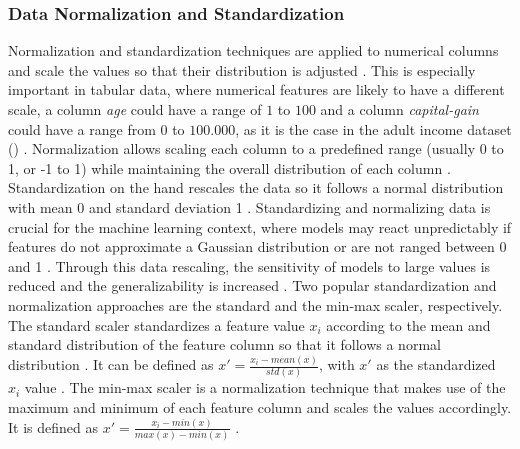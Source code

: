 \subsubsection{Data Normalization and Standardization}
\label{sec:dataNormalization} 
Normalization and standardization techniques are applied to numerical columns and scale the values so that their distribution is adjusted \cite{garcia2016BigDataPreprocessing}.
This is especially important in tabular data, where numerical features are likely to have a different scale, \eg a column \textit{age} could have a range of $1$ to $100$ and a column \textit{capital-gain} could have a range from $0$ to $100.000$, as it is the case in the adult income dataset () \cite{Dua:2019}.
Normalization allows scaling each column to a predefined range (usually 0 to 1, or -1 to 1) while maintaining the overall distribution of each column \cite{izonin2022TwoStepDataNormalization}.
Standardization on the hand rescales the data so it follows a normal distribution with mean 0 and standard deviation 1 \cite{scikit-learndevelopers2023PreprocessingData}.
Standardizing and normalizing data is crucial for the machine learning context, where \glspl{model} may react unpredictably if features do not approximate a Gaussian distribution or are not ranged between 0 and 1 \cite{scikit-learn, scikit-learndevelopers2023PreprocessingData}.
Through this data rescaling, the sensitivity of models to large values is reduced and the generalizability is increased \cite{izonin2022TwoStepDataNormalization}.
Two popular standardization and normalization approaches are the standard and the min-max scaler, respectively.
The standard scaler standardizes a feature value $x_i$ according to the mean and standard distribution of the feature column so that it follows a normal distribution \cite{garcia2016BigDataPreprocessing, izonin2022TwoStepDataNormalization}.
It can be defined as $x' = \frac{x_i-mean(x)}{std(x)}$, with $x'$ as the standardized $x_i$ value \cite{izonin2022TwoStepDataNormalization}.
The min-max scaler is a normalization technique that makes use of the maximum and minimum of each feature column and scales the values accordingly.
It is defined as $x' = \frac{x_i - min(x)}{max(x) - min(x)}$ \cite{izonin2022TwoStepDataNormalization}.
